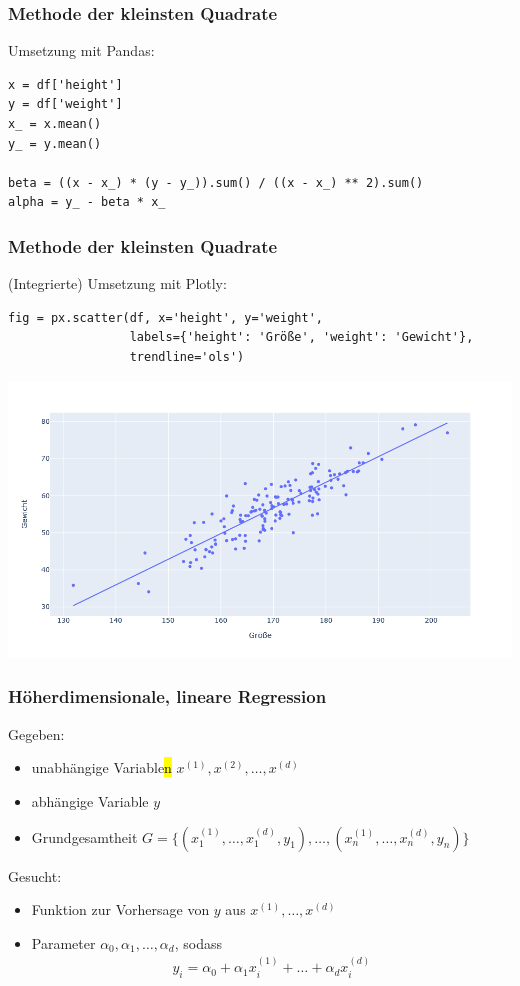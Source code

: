 
\begin{frame}[fragile]
\frametitle{Methode der kleinsten Quadrate}

Umsetzung mit Pandas:
\begin{verbatim}
x = df['height']
y = df['weight']
x_ = x.mean()
y_ = y.mean()

beta = ((x - x_) * (y - y_)).sum() / ((x - x_) ** 2).sum()
alpha = y_ - beta * x_
\end{verbatim}

\end{frame}


\begin{frame}[fragile]
\frametitle{Methode der kleinsten Quadrate}

(Integrierte) Umsetzung mit Plotly:
\begin{verbatim}
fig = px.scatter(df, x='height', y='weight',
                 labels={'height': 'Größe', 'weight': 'Gewicht'},
                 trendline='ols')
\end{verbatim}

\begin{center}
\includegraphics[width=0.6\linewidth]{fig8/artifical-ols.png}
\end{center}

\end{frame}


\begin{frame}
\frametitle{Höherdimensionale, lineare Regression}

Gegeben:
\begin{itemize}
	\item unabhängige Variable\hl{n} $x^{(1)}, x^{(2)}, \dots, x^{(d)}$
	\item abhängige Variable $y$
	\item Grundgesamtheit $G = \{(x^{(1)}_1, \dots, x^{(d)}_1, y_1), \dots, (x^{(1)}_n, \dots, x^{(d)}_n, y_n)\}$
\end{itemize}

Gesucht:
\begin{itemize}
	\item Funktion zur Vorhersage von $y$ aus $x^{(1)}, \dots, x^{(d)}$
	\item Parameter $\alpha_0, \alpha_1, \dots, \alpha_d$, sodass \begin{align*}
		y_i = \alpha_0 + \alpha_1 x^{(1)}_i + \dots + \alpha_d x^{(d)}_i
	\end{align*}
\end{itemize}

\end{frame}

